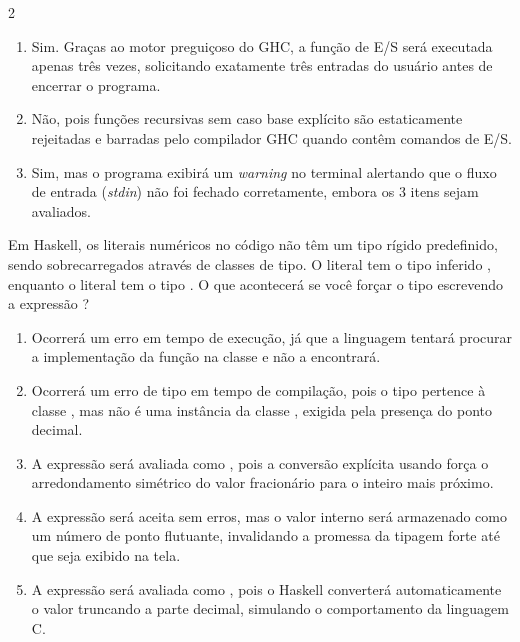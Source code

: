 \documentclass[a4paper,10pt,brazil]{article}
\begin{document}
\begin{multicols}{2}
\begin{enumerate}
  \item Sim. Graças ao motor preguiçoso do GHC, a função de E/S será executada apenas três vezes, solicitando exatamente três entradas do usuário antes de encerrar o programa.

  \item Não, pois funções recursivas sem caso base explícito são estaticamente rejeitadas e barradas pelo compilador GHC quando contêm comandos de E/S.

  \item Sim, mas o programa exibirá um \emph{warning} no terminal alertando que o fluxo de entrada (\emph{stdin}) não foi fechado corretamente, embora os 3 itens sejam avaliados.


\end{enumerate}

Em Haskell, os literais numéricos no código não têm um tipo rígido predefinido, sendo sobrecarregados através de classes de tipo. O literal  tem o tipo inferido , enquanto o literal  tem o tipo . 
O que acontecerá se você forçar o tipo escrevendo a expressão ?

\begin{enumerate}
  \item Ocorrerá um erro em tempo de execução, já que a linguagem tentará procurar a implementação da função  na classe  e não a encontrará.

  \item Ocorrerá um erro de tipo em tempo de compilação, pois o tipo  pertence à classe , mas não é uma instância da classe , exigida pela presença do ponto decimal.

  \item A expressão será avaliada como , pois a conversão explícita usando \haskellinline{::} força o arredondamento simétrico do valor fracionário para o inteiro mais próximo.

  \item A expressão será aceita sem erros, mas o valor interno será armazenado como um número de ponto flutuante, invalidando a promessa da tipagem forte até que seja exibido na tela.

  \item A expressão será avaliada como , pois o Haskell converterá automaticamente o valor truncando a parte decimal, simulando o comportamento da linguagem C.



\end{enumerate}
\end{multicols}
\end{document}
